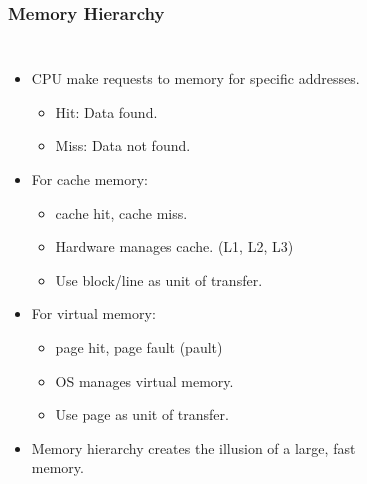 \begin{frame}
    \frametitle{Memory Hierarchy}
    \begin{columns}
        \begin{itemize}
            \item CPU make requests to memory for specific addresses.
            \begin{itemize}
                \item Hit: Data found.
                \item Miss: Data not found.
            \end{itemize}
            \item For cache memory:
            \begin{itemize}
                \item cache hit, cache miss.
                \item Hardware manages cache. (L1, L2, L3)
                \item Use block/line as unit of transfer.
            \end{itemize}
            \item For virtual memory:
            \begin{itemize}
                \item page hit, page fault (pault)
                \item OS manages virtual memory.
                \item Use page as unit of transfer.
            \end{itemize}
            \item Memory hierarchy creates the illusion of a large, fast memory.
        \end{itemize}

        \newsavebox{\asciimemheir}
        \begin{lrbox}{\asciimemheir}
            \begin{varwidth}{\maxdimen}
            \end{varwidth}
        \end{lrbox}%

        \begin{figure}[h]
            \centering
            \scalebox{0.7}{\usebox{\asciimemheir}}
        \end{figure}

    \end{columns}
\end{frame}

